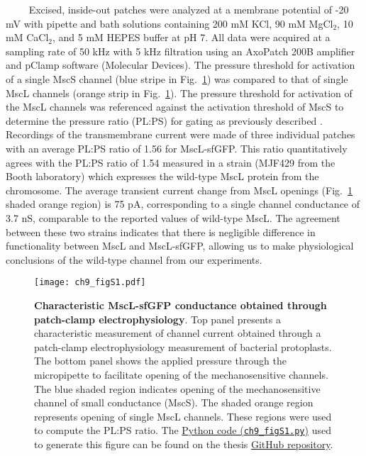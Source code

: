 \documentclass[12pt]{caltech_thesis}
\begin{document}
~~~~ Excised, inside-out patches were analyzed at a membrane potential
of -20 mV with pipette and bath solutions containing 200 mM KCl, 90 mM
MgCl\(_2\), 10 mM CaCl\(_2\), and 5 mM HEPES buffer at pH 7. All data
were acquired at a sampling rate of 50 kHz with 5 kHz filtration using
an AxoPatch 200B amplifier and pClamp software (Molecular Devices). The
pressure threshold for activation of a single MscS channel (blue stripe
in Fig.~\ref{fig:ephys}) was compared to that of single MscL channels
(orange strip in Fig.~\ref{fig:ephys}). The pressure threshold for
activation of the MscL channels was referenced against the activation
threshold of MscS to determine the pressure ratio (PL:PS) for gating as
previously described \autocite{blount1996}. Recordings of the
transmembrane current were made of three individual patches with an
average PL:PS ratio of 1.56 for MscL-sfGFP. This ratio quantitatively
agrees with the PL:PS ratio of 1.54 measured in a strain (MJF429 from
the Booth laboratory) which expresses the wild-type MscL protein from
the chromosome. The average transient current change from MscL openings
(Fig.~\ref{fig:ephys} shaded orange region) is 75 pA, corresponding to a
single channel conductance of 3.7 nS, comparable to the reported values
of wild-type MscL. The agreement between these two strains indicates
that there is negligible difference in functionality between MscL and
MscL-sfGFP, allowing us to make physiological conclusions of the
wild-type channel from our experiments.

\hypertarget{fig:ephys}{%
\begin{figure}
\centering
\texttt{[image: ch9\_figS1.pdf]}
\caption[{Characteristic MscL-sfGFP conductance obtained through
patch-clamp electrophysiology}]{\textbf{Characteristic MscL-sfGFP
conductance obtained through patch-clamp electrophysiology}. Top panel
presents a characteristic measurement of channel current obtained
through a patch-clamp electrophysiology measurement of bacterial
protoplasts. The bottom panel shows the applied pressure through the
micropipette to facilitate opening of the mechanosensitive channels. The
blue shaded region indicates opening of the mechanosensitive channel of
small conductance (MscS). The shaded orange region represents opening of
single MscL channels. These regions were used to compute the PL:PS
ratio. The
\href{https://github.com/gchure/phd/blob/master/src/chapter_09/code/ch9_figS1.py}{Python
code (\texttt{ch9\_figS1.py})} used to generate this figure can be found
on the thesis \href{https://github.com/gchure/phd}{GitHub repository}.}
\label{fig:ephys}
\end{figure}
}
\end{document}

